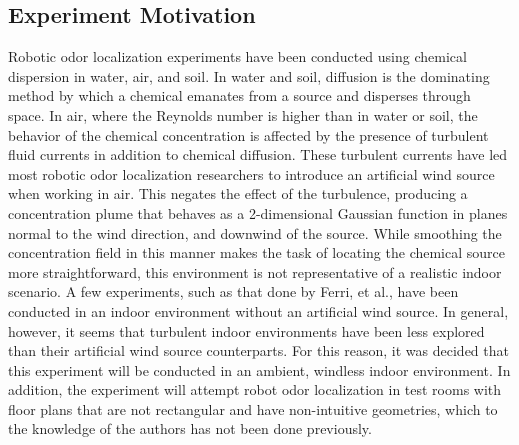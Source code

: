\documentclass[submit, 12pt]{aiaa-pretty-modified}
\begin{document}
\subsection{Experiment Motivation}
Robotic odor localization experiments have been conducted using chemical
dispersion in water, air, and soil.\cite{kowadlo} In water and soil, diffusion is the
dominating method by which a chemical emanates from a source and disperses
through space. In air, where the Reynolds number is higher than in water or
soil, the behavior of the chemical concentration is affected by the presence of
turbulent fluid currents in addition to chemical diffusion.\cite{kowadlo} These turbulent
currents have led most robotic odor localization researchers to introduce an
artificial wind source when working in air. This negates the effect of the
turbulence, producing a concentration plume that behaves as a 2-dimensional
Gaussian function in planes normal to the wind direction, and downwind of the
source. \cite{ferri} While smoothing the concentration field in this manner makes the task of locating the
chemical source more straightforward, this environment is not representative of
a realistic indoor scenario. A few experiments, such as that done by Ferri, et
al., have been conducted in an indoor environment without an artificial wind
source. \cite{ferri} In general, however, it seems that turbulent indoor environments
have been less explored than their artificial wind source counterparts. For this
reason, it was decided that this experiment will be conducted in an ambient,
windless indoor environment. In addition, the experiment will attempt robot odor
localization in test rooms with floor plans that are not rectangular and have
non-intuitive geometries, which to the knowledge of the authors has not been done
previously.
\end{document}
